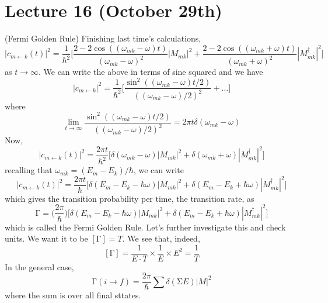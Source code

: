 \section{Lecture 16 (October 29th)}
\begin{thm}
(Fermi Golden Rule)
Finishing last time's calculations,
\[|c_{m\leftarrow k}(t)|^2=\dfrac{1}{\hbar ^2}\Big[\dfrac{2-2\cos ((\omega _{mk}-\omega )t)}{(\omega _{mk}-\omega )^2}|M_{mk}|^2+\dfrac{2-2\cos ((\omega _{mk}+\omega )t)}{(\omega _{mk}+\omega )^2}|M^{\dagger }_{mk}|^2\Big]\]
as $t\rightarrow \infty $. We can write the above in terms of sine squared and we have
\[|c_{m \leftarrow k}|^2=\dfrac{1}{\hbar ^2}\Big[\dfrac{\sin ^2((\omega _{mk}-\omega )t/2)}{((\omega _{mk}-\omega )/2)^2}+\ldots \Big]\]
where
\[\lim _{t\rightarrow \infty }\dfrac{\sin ^2((\omega _{mk}-\omega )t/2)}{((\omega _{mk}-\omega )/2)^2}=2\pi t\delta (\omega _{mk}-\omega )\]
Now,
\[|c_{m\leftarrow k}(t)|^2=\dfrac{2\pi t}{\hbar ^2}\Big[\delta (\omega _{mk}-\omega )|M_{mk}|^2+\delta (\omega _{mk}+\omega )|M^{\dagger }_{mk}|^2\Big]\]
recalling that $\omega _{mk}=(E_{m}-E_{k})/\hbar $, we can write
\[|c_{m\leftarrow k}(t)|^2=\dfrac{2\pi t}{\hbar }\Big[\delta (E_{m}-E_{k}-\hbar \omega )|M_{mk}|^2+\delta (E_{m}-E_{k}+\hbar \omega )|M^{\dagger }_{mk}|^2\Big]\]
which gives the transition probability per time, the transition rate, as
\[\mathrm{\Gamma} =\Big(\dfrac{2\pi }{\hbar }\Big)\Big[\delta (E_{m}-E_{k}-\hbar \omega )|M_{mk}|^2+\delta (E_{m}-E_{k}+\hbar \omega )|M^{\dagger }_{mk}|^2\Big]\]
which is called the Fermi Golden Rule. Let's further investigate this and check units. We want it to be $[\mathrm{\Gamma} ]=T$. We see that, indeed,
\[[\mathrm{\Gamma} ]=\dfrac{1}{E\cdot T}\times \dfrac{1}{E}\times E^2=\dfrac{1}{T}\]
In the general case,
\[\mathrm{\Gamma} (i\rightarrow f)=\dfrac{2\pi }{\hbar }\sum \delta (\mathrm{\Sigma} E)|M|^2\]
where the sum is over all final sttates.
\end{thm}
\vspace{2ex}
